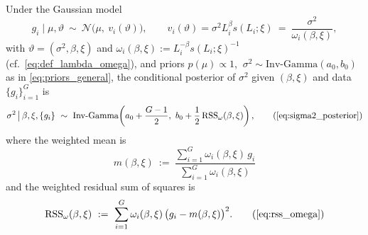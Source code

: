 \begin{proposition}\label{prop:sigma2-posterior}
Under the Gaussian model
\[
g_i \mid \mu,\vartheta \ \sim\ \mathcal{N}\!\big(\mu,\ v_i(\vartheta)\big),
\qquad
v_i(\vartheta)=\sigma^2 L_i^{\beta}s(L_i;\xi)\ =\ \frac{\sigma^2}{\omega_i(\beta,\xi)},
\]
with $\vartheta=(\sigma^2,\beta,\xi)$ and $\omega_i(\beta,\xi):=L_i^{-\beta}s(L_i;\xi)^{-1}$ (cf.\ \eqref{eq:def_lambda_omega}),
and priors $p(\mu)\propto 1$, $\ \sigma^2\sim\mathrm{Inv\text{-}Gamma}(a_0,b_0)$ as in \eqref{eq:priors_general},
the conditional posterior of $\sigma^2$ given $(\beta,\xi)$ and data $\{g_i\}_{i=1}^G$ is
\begin{equation}
  \sigma^2 \,\big|\, \beta,\xi,\{g_i\}
  \ \sim\ 
  \mathrm{Inv\text{-}Gamma}\!\left(
    a_0+\frac{G-1}{2},\ 
    b_0+\frac{1}{2}\,\mathrm{RSS}_\omega(\beta,\xi)
  \right),
  \tag{\ref{eq:sigma2_posterior}}
\end{equation}
where the weighted mean is
\[
m(\beta,\xi)\ :=\ \frac{\sum_{i=1}^G \omega_i(\beta,\xi)\,g_i}{\sum_{i=1}^G \omega_i(\beta,\xi)}
\]
and the weighted residual sum of squares is
\[
\mathrm{RSS}_\omega(\beta,\xi)\ :=\ \sum_{i=1}^G \omega_i(\beta,\xi)\,\big(g_i-m(\beta,\xi)\big)^2.
\tag{\ref{eq:rss_omega}}
\]
\end{proposition}

